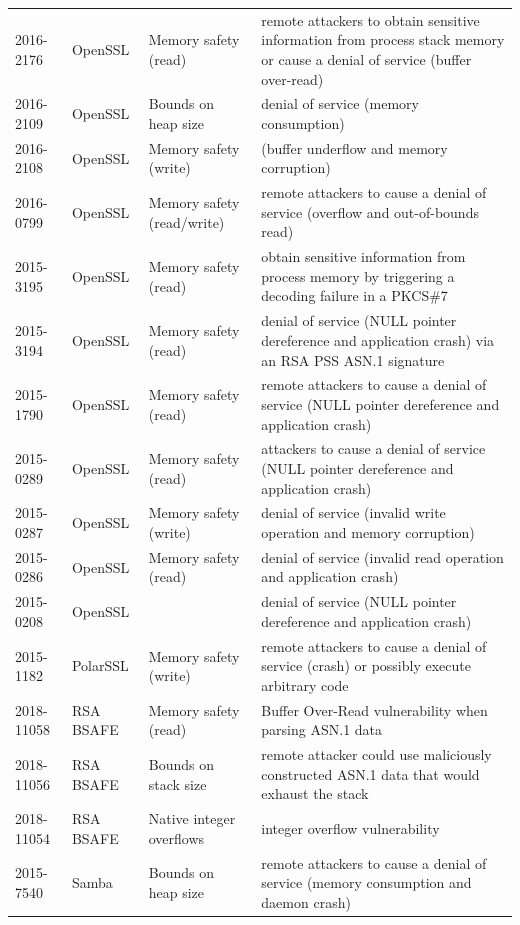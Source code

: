 \documentclass[10p,conference]{IEEEtran}
\begin{document}
\begin{longtable}{ l l l p{25em} }
2016-2176    & OpenSSL       & Memory safety (read) & remote attackers to obtain sensitive information from process stack memory or cause a denial of service (buffer over-read) \\ 
2016-2109    & OpenSSL       & Bounds on heap size & denial of service (memory consumption) \\ 
2016-2108    & OpenSSL       & Memory safety (write) & (buffer underflow and memory corruption) \\ 
2016-0799    & OpenSSL       & Memory safety (read/write) & remote attackers to cause a denial of service (overflow and out-of-bounds read) \\ 
2015-3195    & OpenSSL       & Memory safety (read) & obtain sensitive information from process memory by triggering a decoding failure in a PKCS\#7 \\ 
2015-3194    & OpenSSL       & Memory safety (read) & denial of service (NULL pointer dereference and application crash) via an RSA PSS ASN.1 signature \\ 
2015-1790    & OpenSSL       & Memory safety (read) & remote attackers to cause a denial of service (NULL pointer dereference and application crash) \\ 
2015-0289    & OpenSSL       & Memory safety (read) & attackers to cause a denial of service (NULL pointer dereference and application crash) \\ 
2015-0287    & OpenSSL       & Memory safety (write) & denial of service (invalid write operation and memory corruption) \\ 
2015-0286    & OpenSSL       & Memory safety (read) & denial of service (invalid read operation and application crash) \\ 
2015-0208    & OpenSSL       & & denial of service (NULL pointer dereference and application crash) \\ 
2015-1182    & PolarSSL      & Memory safety (write) & remote attackers to cause a denial of service (crash) or possibly execute arbitrary code \\ 
2018-11058   & RSA BSAFE     & Memory safety (read) & Buffer Over-Read vulnerability when parsing ASN.1 data \\ 
2018-11056   & RSA BSAFE     & Bounds on stack size & remote attacker could use maliciously constructed ASN.1 data that would exhaust the stack \\ 
2018-11054   & RSA BSAFE     & Native integer overflows & integer overflow vulnerability \\ 
2015-7540    & Samba         & Bounds on heap size & remote attackers to cause a denial of service (memory consumption and daemon crash) \\ 

\end{longtable}
\end{document}
